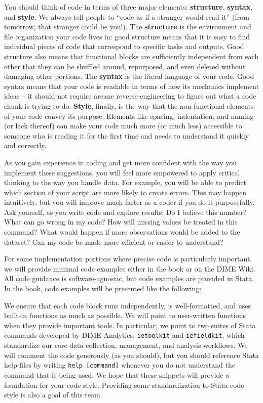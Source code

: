 You should think of code in terms of three major elements:
\textbf{structure}, \textbf{syntax}, and \textbf{style}.
We always tell people to ``code as if a stranger would read it''
(from tomorrow, that stranger could be you!).
The \textbf{structure} is the environment and file organization your code lives in:
good structure means that it is easy to find individual pieces of code
that correspond to specific tasks and outputs.
Good structure also means that functional blocks are sufficiently independent from each other
that they can be shuffled around, repurposed, and even deleted without damaging other portions.
The \textbf{syntax} is the literal language of your code.
Good syntax means that your code is readable
in terms of how its mechanics implement ideas --
it should not require arcane reverse-engineering
to figure out what a code chunk is trying to do.
\textbf{Style}, finally, is the way that the non-functional elements of your code convey its purpose.
Elements like spacing, indentation, and naming (or lack thereof) can make your code much more
(or much less) accessible to someone who is reading it for the first time
and needs to understand it quickly and correctly.

As you gain experience in coding
and get more confident with the way you implement these suggestions,
you will feel more empowered to apply critical thinking to the way you handle data.
For example, you will be able to predict which section
of your script are more likely to create errors.
This may happen intuitively, but you will improve much faster as a coder
if you do it purposefully.
Ask yourself, as you write code and explore results:
Do I believe this number?
What can go wrong in my code?
How will missing values be treated in this command?
What would happen if more observations would be added to the dataset?
Can my code be made more efficient or easier to understand?

For some implementation portions where precise code is particularly important,
we will provide minimal code examples either in the book or on the DIME Wiki.
All code guidance is software-agnostic, but code examples are provided in Stata.
In the book, code examples will be presented like the following:


We ensure that each code block runs independently, is well-formatted,
and uses built-in functions as much as possible.
We will point to user-written functions when they provide important tools.
In particular, we point to two suites of Stata commands developed by DIME Analytics,
\texttt{ietoolkit} and
\texttt{iefieldkit},
which standardize our core data collection, management, and analysis workflows.
We will comment the code generously (as you should),
but you should reference Stata help-files by writing \texttt{help [command]}
whenever you do not understand the command that is being used.
We hope that these snippets will provide a foundation for your code style.
Providing some standardization to Stata code style is also a goal of this team.

